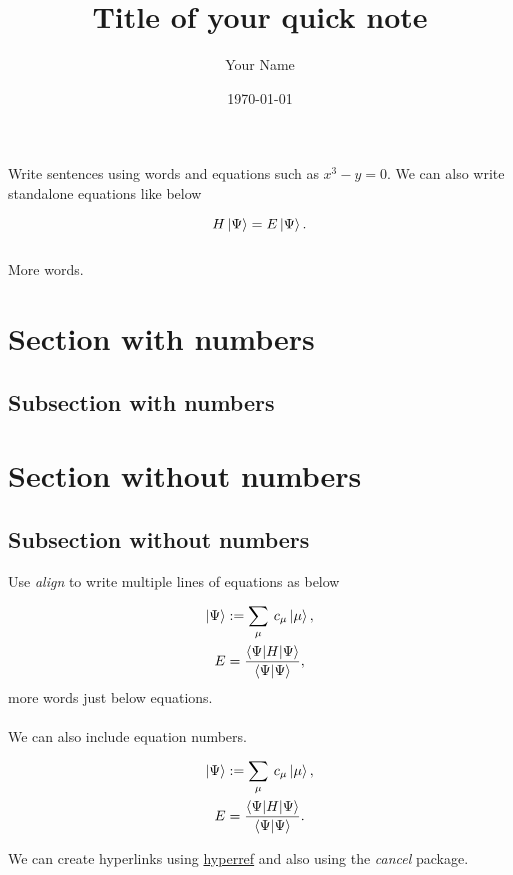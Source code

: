 \documentclass[22pt,a4paper,notitlepage]{article}
\begin{document}
\title{Title of your quick note}
\author{Your Name}
\date{\today} %
\maketitle


\noindent %
Write sentences using words and equations such as $x^3 - y = 0$. We can also write standalone equations like below

$$ H \ket{\Psi} 
= E \ket{\Psi}.
$$
\\ %
More words.

\section{Section with numbers}

   \subsection{Subsection with numbers}

\section*{Section without numbers}

   \subsection*{Subsection without numbers}

   Use \textit{align} to write multiple lines of equations as below

   \begin{align*}
   \ket{\Psi} 
   &:= \sum_{\mu} \: c_{\mu} \ket{\mu},
   \\
   E 
   &= \frac{\braket{\Psi | H | \Psi}}{\braket{\Psi|\Psi}},
   \end{align*}
   more words just below equations.
   \\ \\ %
   We can also include equation numbers.
   
   \begin{align}
   \ket{\Psi} 
   &:= \sum_{\mu} \: c_{\mu} \ket{\mu},
   \\
   E 
   &= \frac{\braket{\Psi | H | \Psi}}{\braket{\Psi|\Psi}}.
   \end{align}
   
   \noindent
   We can create hyperlinks using \href{https://www.overleaf.com/learn/latex/Hyperlinks}{hyperref} and also  using the \textit{cancel} package.
   
\end{document}
